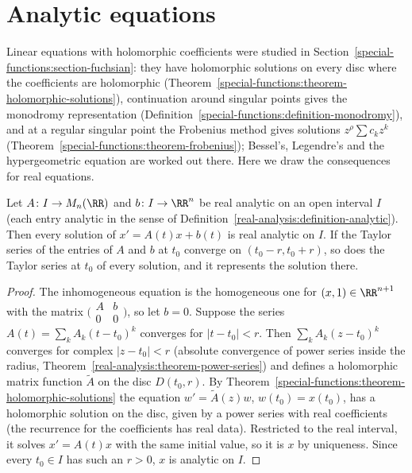 \section{Analytic equations}\label{ordinary-differential-equations:section-complex-domain}

Linear equations with holomorphic coefficients were studied in Section~\ref{special-functions:section-fuchsian}: they have holomorphic solutions on every disc where the coefficients are holomorphic
(Theorem~\ref{special-functions:theorem-holomorphic-solutions}), continuation around singular points gives the monodromy representation (Definition~\ref{special-functions:definition-monodromy}), and at a regular singular point
the Frobenius method gives solutions $z^\rho\sum c_kz^k$ (Theorem~\ref{special-functions:theorem-frobenius}); Bessel's, Legendre's and the hypergeometric equation are worked out there. Here we draw the consequences for real
equations.

\begin{theorem}\label{ordinary-differential-equations:theorem-real-analytic}
Let $A \colon I \to M_n(\RR)$ and $b \colon I \to \RR^n$ be real analytic on an open interval $I$ (each entry analytic in the sense of Definition~\ref{real-analysis:definition-analytic}). Then every solution of $x' = A(t)x + b(t)$ is real analytic on
$I$. If the Taylor series of the entries of $A$ and $b$ at $t_0$ converge on $(t_0 - r, t_0 + r)$, so does the Taylor series at $t_0$ of every solution, and it represents the solution there.
\end{theorem}

\begin{proof}
The inhomogeneous equation is the homogeneous one for $(x, 1) \in \RR^{n+1}$ with the matrix $\bigl(\begin{smallmatrix}A & b\\ 0 & 0\end{smallmatrix}\bigr)$, so let $b = 0$. Suppose the series $A(t) = \sum_kA_k(t - t_0)^k$ converges for $|t - t_0| < r$.
Then $\sum_kA_k(z - t_0)^k$ converges for complex $|z - t_0| < r$ (absolute convergence of power series inside the radius, Theorem~\ref{real-analysis:theorem-power-series}) and defines a holomorphic matrix function $\tilde A$ on the disc
$D(t_0, r)$. By Theorem~\ref{special-functions:theorem-holomorphic-solutions} the equation $w' = \tilde A(z)w$, $w(t_0) = x(t_0)$, has a holomorphic solution on the disc, given by a power series with real coefficients (the recurrence
for the coefficients has real data). Restricted to the real interval, it solves $x' = A(t)x$ with the same initial value, so it is $x$ by uniqueness. Since every $t_0 \in I$ has such an $r > 0$, $x$ is analytic on $I$.
\end{proof}

